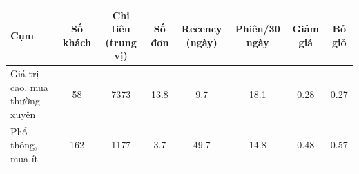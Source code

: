\begin{tabular}{lccccccc}
\toprule
Cụm & Số khách & Chi tiêu (trung vị) & Số đơn & Recency (ngày) & Phiên/30 ngày & Giảm giá & Bỏ giỏ \\
\midrule
Giá trị cao, mua thường xuyên & 58 & 7373 & 13.8 & 9.7 & 18.1 & 0.28 & 0.27 \\
Phổ thông, mua ít & 162 & 1177 & 3.7 & 49.7 & 14.8 & 0.48 & 0.57 \\
\bottomrule
\end{tabular}
